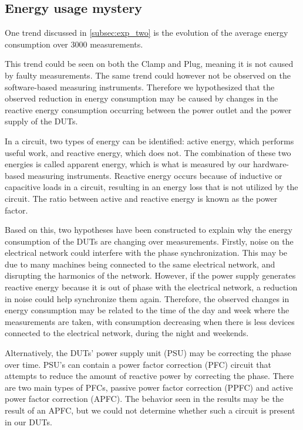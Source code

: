 \subsection{Energy usage mystery}
One trend discussed in \cref{subsec:exp_two} is the evolution of the average energy consumption over 3000 measurements.  



This trend could be seen on both the Clamp and Plug, meaning it is not caused by faulty measurements. The same trend could however not be observed on the software-based measuring instruments. Therefore we hypothesized that the observed reduction in energy consumption may be caused by changes in the reactive energy consumption occurring between the power outlet and the power supply of the DUTs.

In a circuit, two types of energy can be identified: active energy, which performs useful work, and reactive energy, which does not. The combination of these two energies is called apparent energy, which is what is measured by our hardware-based measuring instruments. Reactive energy occurs because of inductive or capacitive loads in a circuit, resulting in an energy loss that is not utilized by the circuit\cite{ReactP}. The ratio between active and reactive energy is known as the power factor\cite{ReactP}.

Based on this, two hypotheses have been constructed to explain why the energy consumption of the DUTs are changing over measurements. Firstly, noise on the electrical network could interfere with the phase synchronization. This may be due to many machines being connected to the same electrical network, and disrupting the harmonics of the network\cite*{kullarkar2017power}. However, if the power supply generates reactive energy because it is out of phase with the electrical network, a reduction in noise could help synchronize them again. Therefore, the observed changes in energy consumption may be related to the time of the day and week where the measurements are taken, with consumption decreasing when there is less devices connected to the electrical network, during the night and weekends.

Alternatively, the DUTs' power supply unit (PSU) may be correcting the phase over time. PSU's can contain a power factor correction (PFC) circuit that attempts to reduce the amount of reactive power by correcting the phase. There are two main types of PFCs, passive power factor correction (PPFC) and active power factor correction (APFC)\cite{mcdonald2020power}. The behavior seen in the results may be the result of an APFC, but we could not determine whether such a circuit is present in our DUTs. %

